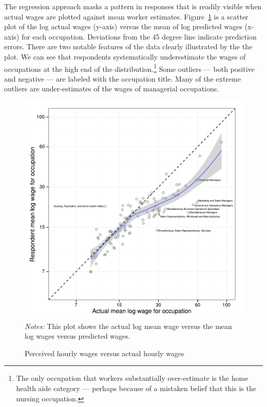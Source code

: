\documentclass[12pt]{article}
\begin{document}
The regression approach masks a pattern in responses that is readily visible when actual wages are plotted against mean worker estimates. 
Figure~\ref{fig:prediction_scatter} is a scatter plot of the log actual wages (y-axis) versus the mean of log predicted wages (x-axis) for each occupation. 
Deviations from the 45 degree line indicate prediction errors. 
There are two notable features of the data clearly illustrated by the the plot. 
We can see that respondents systematically underestimate the wages of occupations at the high end of the distribution.\footnote{The only occupation that workers substantially over-estimate is the home health aide category --- perhaps because of a mistaken belief that this is the nursing occupation.}  
Some outliers --- both positive and negative --- are labeled with the occupation title.  
Many of the extreme outliers are under-estimates of the wages of managerial occupations. 

\begin{figure}
\caption{Perceived hourly wages versus actual hourly wages \label{fig:prediction_scatter}} 
\centering 
\begin{minipage}{0.90 \linewidth}
\includegraphics[width = \linewidth]{./plots/predicted_v_actual.pdf} 
\\
\emph{Notes:} This plot shows the actual log mean wage versus the mean log wages versus predicted wages.  
\end{minipage}  
\end{figure} 
\end{document}
